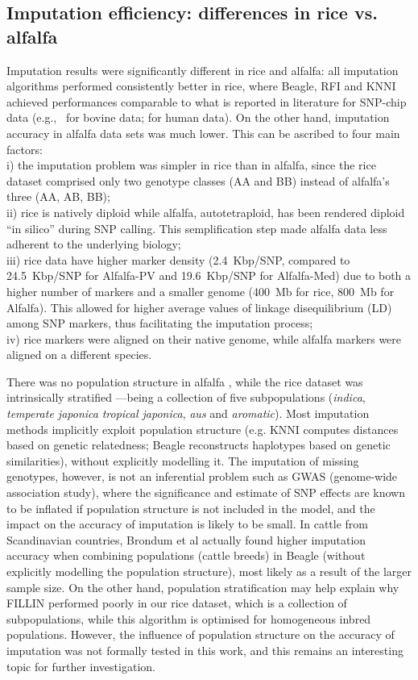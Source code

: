\subsection{Imputation efficiency: differences in rice vs. alfalfa}
\label{sec:role_of_species}
Imputation results were significantly different in rice and alfalfa: all imputation algorithms performed consistently better in rice, where Beagle, RFI and KNNI achieved performances comparable to what is reported in literature for SNP-chip data (e.g.,~\cite{vanraden_genomic_2013} for bovine data;
\cite{the_1000_genomes_project_consortium_integrated_2012}
for human data). On the other hand, imputation accuracy in alfalfa data sets was much lower. This can be ascribed to four main factors: \\
i) the imputation problem was simpler in rice than in alfalfa, since the rice dataset comprised only two genotype classes (AA and BB) instead of alfalfa's three (AA, AB, BB); \\
ii) rice is natively diploid while alfalfa, autotetraploid, has been rendered diploid ``in silico'' during SNP calling. This semplification step made alfalfa data less adherent to the underlying biology;\\
iii) rice data have higher marker density (2.4~Kbp/SNP, compared to 24.5~Kbp/SNP for Alfalfa-PV and 19.6~Kbp/SNP for Alfalfa-Med) due to both a higher number of markers and a smaller genome (400~Mb for rice, 800~Mb for Alfalfa). This allowed for higher average values of linkage disequilibrium (LD) among SNP markers, thus facilitating the imputation process;\\
iv) rice markers were aligned on their native genome, while alfalfa markers were aligned on a different species.


There was no population structure in alfalfa \cite{Annicchiarico2015}, while the rice dataset was intrinsically stratified ---being a collection of five subpopulations (\textit{indica}, \textit{temperate japonica} \textit{tropical japonica}, \textit{aus} and \textit{aromatic}). Most imputation methods implicitly exploit population structure (e.g. KNNI computes distances based on genetic relatedness; Beagle reconstructs haplotypes based on genetic similarities), without explicitly modelling it. The imputation of missing genotypes, however, is not an inferential problem such as GWAS (genome-wide association study), where the significance and estimate of SNP effects are known to be inflated if population structure is not included in the model, and the impact on the accuracy of imputation is likely to be small. In cattle from Scandinavian countries, Brondum et al \cite{brondum2012short} actually found higher imputation accuracy when combining populations (cattle breeds) in Beagle (without explicitly modelling the population structure), most likely as a result of the larger sample size. On the other hand, population stratification may help explain why FILLIN performed poorly in our rice dataset, which is a collection of subpopulations, while this algorithm is optimised for homogeneous inbred populations. 
However, the influence of population structure on the accuracy of imputation was not formally tested in this work, and this remains an interesting topic for further investigation.


